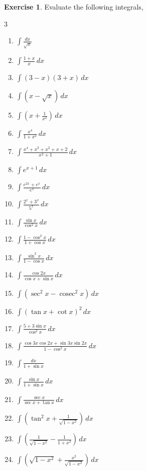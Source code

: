 \documentclass{book}
\DeclareMathOperator{\cosec}{cosec}
\theoremstyle{definition}
\newtheorem{exercise}{Exercise}[section]
\begin{document}
\begin{exercise}
Evaluate the following integrals,
\begin{multicols}{3}
\begin{enumerate}
    \item $\displaystyle\int \frac{dx}{\sqrt{x}}$
    \item $\displaystyle\int\frac{1+x}{x} \, dx$
    \item $\displaystyle\int(3-x)(3+x) \, dx$
    \item $\displaystyle\int(x-\sqrt{x}) \, dx$
    \item $\displaystyle\int(x+\frac{1}{x^2}) \, dx$
    \item $\displaystyle\int \frac{x^4}{1+x^2} \, dx$
    \item $\displaystyle\int\frac{x^4+x^3+x^2+x+2}{x^2+1} \, dx$
    \item $\displaystyle\int e^{x+1} \, dx$
    \item $\displaystyle\int\frac{e^{2x}+e^x}{e^x} \, dx$
    \item $\displaystyle\int\frac{2^x+3^x}{5^x} \, dx$
    \item $\displaystyle\int\frac{\sin x}{\cos^2 x} \, dx$
    \item $\displaystyle\int\frac{1-\cos^2 x}{1+\cos x} \, dx$
    \item $\displaystyle\int\frac{\sin^2 x}{1-\cos x} \, dx$
    \item $\displaystyle\int\frac{\cos 2x}{\cos x+\sin x} \, dx$
    \item $\displaystyle\int (\sec^2x-\cosec^2x) \, dx$
    \item $\displaystyle\int (\tan x+\cot x)^2 \, dx$
    \item $\displaystyle\int\frac{5+3\sin x}{\cos^2x} \, dx$
    \item $\displaystyle\int\frac{\cos 3x\cos 2x+\sin 3x\sin2x}{1-\cos^2x} \, dx$
    \item $\displaystyle\int\frac{dx}{1+\sin x}$
    \item $\displaystyle\int\frac{\sin x}{1+\sin x} \, dx$
    \item $\displaystyle\int\frac{\sec x}{\sec x+\tan x} \, dx$
    \item $\displaystyle\int (\tan^2x+\frac{1}{\sqrt{1-x^2}}) \, dx$
    \item $\displaystyle\int (\frac{1}{\sqrt{1-x^2}}-\frac{1}{1+x^2}) \, dx$
    \item $\displaystyle\int(\sqrt{1-x^2}+\frac{x^2}{\sqrt{1-x^2}}) \, dx$
\end{enumerate} 
\end{multicols}

\end{exercise}
\end{document}
